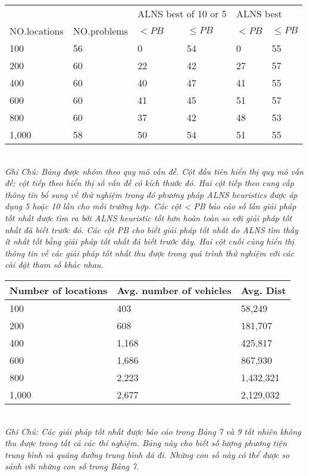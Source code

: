 \begin{table}[caption={Comparison with Previously Best Known Solutions}, label=tab:2]
    \begin{tabular}{llllll}
        \toprule
         & & \multicolumn{2}{l}{\footnotesize{ALNS best of 10 or 5}} & \multicolumn{2}{l}{\footnotesize{ALNS best}} \\
         \scriptsize{NO.locations} &\scriptsize{NO.problems} &\scriptsize{$< PB$}  &\scriptsize{$\leq PB$} &\scriptsize{$< PB$}  &\scriptsize{$\leq PB$} \\
         \midrule
         100   & 56 & 0  & 54 & 0  & 55 \\
         200   & 60 & 22 & 42 & 27 & 57 \\
         400   & 60 & 40 & 47 & 41 & 55 \\
         600   & 60 & 41 & 45 & 51 & 57 \\
         800   & 60 & 37 & 42 & 48 & 53 \\
         1,000 & 58 & 50 & 54 & 51 & 55  \\
    \end{tabular} \\
    \justify
    \textit{Ghi Chú: Bảng được nhóm theo quy mô vấn đề. Cột đầu tiên hiển thị quy mô vấn đề; cột tiếp theo hiển thị số vấn đề có kích thước đó. Hai cột tiếp theo cung cấp thông tin bổ sung về thử nghiệm trong đó phương pháp ALNS heuristics được áp dụng 5 hoặc 10 lần cho mỗi trường hợp. Các cột < PB báo cáo số lần giải pháp tốt nhất được tìm ra bởi ALNS heuristic tốt hơn hoàn toàn so với giải pháp tốt nhất đã biết trước đó. Các cột PB cho biết giải pháp tốt nhất do ALNS tìm thấy ít nhất tốt bằng giải pháp tốt nhất đã biết trước đây. Hai cột cuối cùng hiển thị thông tin về các giải pháp tốt nhất thu được trong quá trình thử nghiệm với các cài đặt tham số khác nhau.}
\end{table}

\begin{table}[caption={Average Performance of the ALNS Heuristic}, label=tab:2]
    \begin{tabular}{lll}
        \toprule
        Number of locations& Avg. number of vehicles & Avg. Dist \\ \midrule
    100 & 403 & 58,249   \\
    200 & 608 & 181,707   \\
    400 & 1,168 & 425,817  \\
    600 & 1,686 & 867,930   \\
    800 & 2,223 & 1,432,321  \\
    1,000 & 2,677 & 2,129,032 \\
    \end{tabular} \\
    \justify
    \textit{Ghi Chú: Các giải pháp tốt nhất được báo cáo trong Bảng 7 và 9 tất nhiên không thu được trong tất cả các thí nghiệm. Bảng này cho biết số lượng phương tiện trung bình và quãng đường trung bình đã đi. Những con số này có thể được so sánh với những con số trong Bảng 7.}
\end{table}

